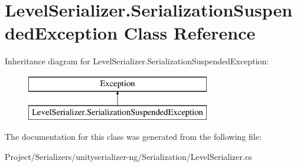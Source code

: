 \hypertarget{class_level_serializer_1_1_serialization_suspended_exception}{}\section{Level\+Serializer.\+Serialization\+Suspended\+Exception Class Reference}
\label{class_level_serializer_1_1_serialization_suspended_exception}
Inheritance diagram for Level\+Serializer.\+Serialization\+Suspended\+Exception\+:\begin{figure}[H]
\begin{center}
\leavevmode
\includegraphics[height=2.000000cm]{class_level_serializer_1_1_serialization_suspended_exception}
\end{center}
\end{figure}


The documentation for this class was generated from the following file\+:\begin{DoxyCompactItemize}
\item 
Project/\+Serializers/unityserializer-\/ng/\+Serialization/Level\+Serializer.\+cs\end{DoxyCompactItemize}
